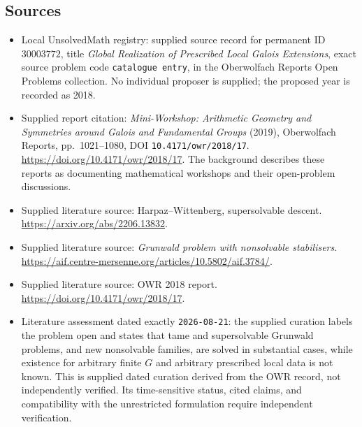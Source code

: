 \documentclass[11pt]{article}
\begin{document}
\subsection{Sources}
\begin{itemize}
\item Local UnsolvedMath registry: supplied source record for permanent ID \(30003772\), title \emph{Global Realization of Prescribed Local Galois Extensions}, exact source problem code \texttt{catalogue entry}, in the Oberwolfach Reports Open Problems collection. No individual proposer is supplied; the proposed year is recorded as 2018.
\item Supplied report citation: \emph{Mini-Workshop: Arithmetic Geometry and Symmetries around Galois and Fundamental Groups} (2019), Oberwolfach Reports, pp.\ 1021--1080, DOI \texttt{10.4171/owr/2018/17}. \url{https://doi.org/10.4171/owr/2018/17}. The background describes these reports as documenting mathematical workshops and their open-problem discussions.
\item Supplied literature source: Harpaz--Wittenberg, supersolvable descent. \url{https://arxiv.org/abs/2206.13832}.
\item Supplied literature source: \emph{Grunwald problem with nonsolvable stabilisers}. \url{https://aif.centre-mersenne.org/articles/10.5802/aif.3784/}.
\item Supplied literature source: OWR 2018 report. \url{https://doi.org/10.4171/owr/2018/17}.
\item Literature assessment dated exactly \texttt{2026-08-21}: the supplied curation labels the problem open and states that tame and supersolvable Grunwald problems, and new nonsolvable families, are solved in substantial cases, while existence for arbitrary finite \(G\) and arbitrary prescribed local data is not known. This is supplied dated curation derived from the OWR record, not independently verified. Its time-sensitive status, cited claims, and compatibility with the unrestricted formulation require independent verification.
\end{itemize}
\end{document}
